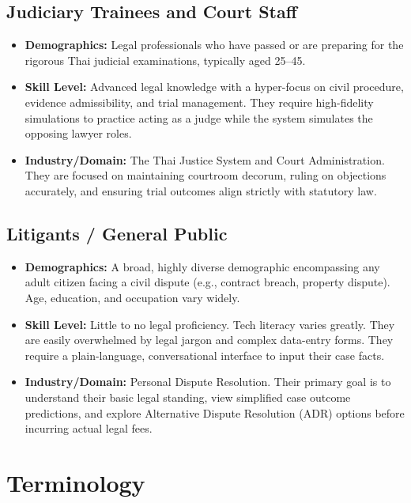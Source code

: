 \subsection{Judiciary Trainees and Court Staff}
\begin{itemize}
    \item \textbf{Demographics:} Legal professionals who have passed or are preparing for the rigorous Thai judicial examinations, typically aged 25--45.
    \item \textbf{Skill Level:} Advanced legal knowledge with a hyper-focus on civil procedure, evidence admissibility, and trial management. They require high-fidelity simulations to practice acting as a judge while the system simulates the opposing lawyer roles.
    \item \textbf{Industry/Domain:} The Thai Justice System and Court Administration. They are focused on maintaining courtroom decorum, ruling on objections accurately, and ensuring trial outcomes align strictly with statutory law.
\end{itemize}

\subsection{Litigants / General Public}
\begin{itemize}
    \item \textbf{Demographics:} A broad, highly diverse demographic encompassing any adult citizen facing a civil dispute (e.g., contract breach, property dispute). Age, education, and occupation vary widely.
    \item \textbf{Skill Level:} Little to no legal proficiency. Tech literacy varies greatly. They are easily overwhelmed by legal jargon and complex data-entry forms. They require a plain-language, conversational interface to input their case facts.
    \item \textbf{Industry/Domain:} Personal Dispute Resolution. Their primary goal is to understand their basic legal standing, view simplified case outcome predictions, and explore Alternative Dispute Resolution (ADR) options before incurring actual legal fees.
\end{itemize}

\section{Terminology}
\label{section:terminology}



